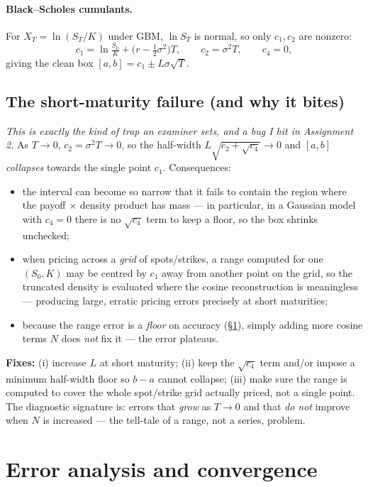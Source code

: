 \documentclass[11pt]{article}
\begin{document}
\paragraph{Black--Scholes cumulants.}
For $X_T=\ln(S_T/K)$ under GBM, $\ln S_T$ is normal, so only $c_1,c_2$ are nonzero:
\begin{equation}
c_1=\ln\tfrac{S_0}{K}+\Big(r-\tfrac12\sigma^2\Big)T,\qquad
c_2=\sigma^2 T,\qquad c_4=0,
\end{equation}
giving the clean box $[a,b]=c_1\pm L\sigma\sqrt{T}$.

\subsection{The short-maturity failure (and why it bites)}\label{sec:bug}
\emph{This is exactly the kind of trap an examiner sets, and a bug I hit in Assignment 2.} As $T\to0$,
$c_2=\sigma^2 T\to 0$, so the half-width $L\sqrt{c_2+\sqrt{c_4}}\to 0$ and $[a,b]$ \emph{collapses} towards the
single point $c_1$. Consequences:
\begin{itemize}[leftmargin=*]
  \item the interval can become so narrow that it fails to contain the region where the payoff $\times$ density
  product has mass --- in particular, in a Gaussian model with $c_4=0$ there is no $\sqrt{c_4}$ term to keep a
  floor, so the box shrinks unchecked;
  \item when pricing across a \emph{grid} of spots/strikes, a range computed for one $(S_0,K)$ may be centred
  by $c_1$ away from another point on the grid, so the truncated density is evaluated where the cosine
  reconstruction is meaningless --- producing large, erratic pricing errors precisely at short maturities;
  \item because the range error is a \emph{floor} on accuracy (\S\ref{sec:convergence}), simply adding more
  cosine terms $N$ does \emph{not} fix it --- the error plateaus.
\end{itemize}
\textbf{Fixes:} (i) increase $L$ at short maturity; (ii) keep the $\sqrt{c_4}$ term and/or impose a minimum
half-width floor so $b-a$ cannot collapse; (iii) make sure the range is computed to cover the whole
spot/strike grid actually priced, not a single point. The diagnostic signature is: errors that \emph{grow} as
$T\to 0$ and that \emph{do not} improve when $N$ is increased --- the tell-tale of a range, not a series,
problem.

\section{Error analysis and convergence}\label{sec:convergence}
\end{document}
